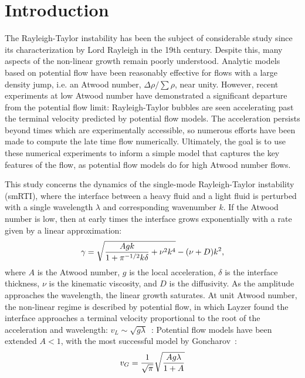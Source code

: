 \section{Introduction} 

The Rayleigh-Taylor instability has been the subject of considerable study since its characterization by Lord Rayleigh in the 19th century.
Despite this, many aspects of the non-linear growth remain poorly understood.
Analytic models based on potential flow have been reasonably effective for flows with a large density jump, i.e. an Atwood number, $\Delta \rho / \sum \rho$, near unity.
However, recent experiments at low Atwood number have demonstrated a significant departure from the potential flow limit:
Rayleigh-Taylor bubbles are seen accelerating past the terminal velocity predicted by potential flow models.
The acceleration persists beyond times which are experimentally accessible, so numerous efforts have been made to compute the late time flow numerically.
Ultimately, the goal is to use these numerical experiments to inform a simple model that captures the key features of the flow, as potential flow models do for high Atwood number flows.

This study concerns the dynamics of the single-mode Rayleigh-Taylor instability (smRTI), where the interface between a heavy fluid and a light fluid is perturbed with a single wavelength $\lambda$ and corresponding wavenumber $k$.
If the Atwood number is low, then at early times the interface grows exponentially with a rate given by a linear approximation:
\begin{equation} \elabel{duff0}
\gamma = \sqrt{\frac{A g k}{1 + \pi^{-1/2} k \delta} + \nu^2 k^4} - (\nu + D) k^2,
\end{equation}
where $A$ is the Atwood number,
$g$ is the local acceleration,
$\delta$ is the interface thickness,
$\nu$ is the kinematic viscosity, and
$D$ is the diffusivity.
As the amplitude approaches the wavelength, the linear growth saturates.
At unit Atwood number, the non-linear regime is described by potential flow, in which Layzer found the interface approaches a terminal velocity proportional to the root of the acceleration and wavelength: $v_L \sim \sqrt{g \lambda}$~\cite{Layzer1955}:
Potential flow models have been extended $A < 1$, with the most successful model by Goncharov~\cite{Goncharov2002}:
\begin{equation} \elabel{goncharov}
v_G = \frac{1}{\sqrt{\pi}} \sqrt{\frac{A g \lambda}{1+A}}
\end{equation}

